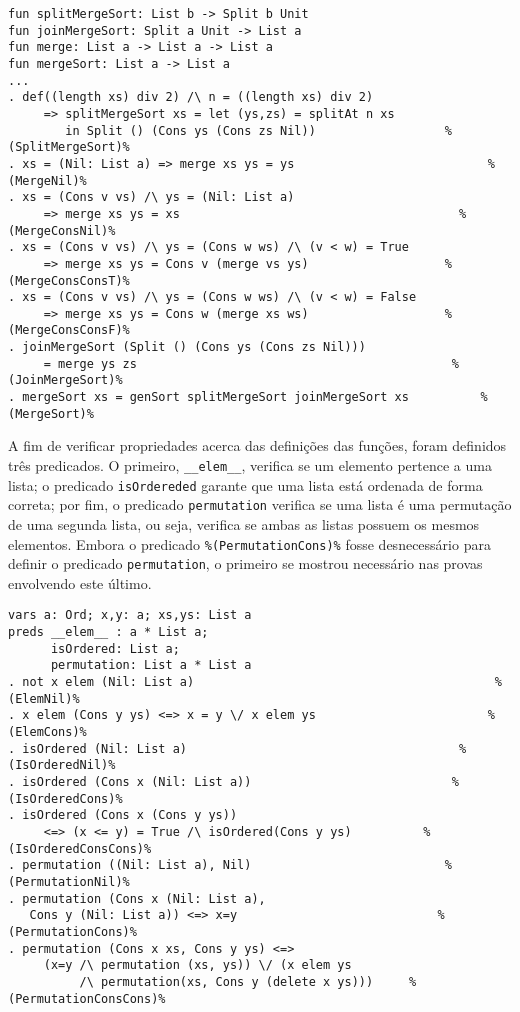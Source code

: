 \begin{Verbatim}
fun splitMergeSort: List b -> Split b Unit
fun joinMergeSort: Split a Unit -> List a
fun merge: List a -> List a -> List a
fun mergeSort: List a -> List a
...
. def((length xs) div 2) /\ n = ((length xs) div 2) 
     => splitMergeSort xs = let (ys,zs) = splitAt n xs
        in Split () (Cons ys (Cons zs Nil))                  %(SplitMergeSort)%
. xs = (Nil: List a) => merge xs ys = ys                           %(MergeNil)%
. xs = (Cons v vs) /\ ys = (Nil: List a) 
     => merge xs ys = xs                                       %(MergeConsNil)%
. xs = (Cons v vs) /\ ys = (Cons w ws) /\ (v < w) = True 
     => merge xs ys = Cons v (merge vs ys)                   %(MergeConsConsT)%
. xs = (Cons v vs) /\ ys = (Cons w ws) /\ (v < w) = False 
     => merge xs ys = Cons w (merge xs ws)                   %(MergeConsConsF)%
. joinMergeSort (Split () (Cons ys (Cons zs Nil))) 
     = merge ys zs                                            %(JoinMergeSort)%
. mergeSort xs = genSort splitMergeSort joinMergeSort xs          %(MergeSort)%
\end{Verbatim}

A fim de verificar propriedades acerca das definições das funções, foram definidos três predicados.
O primeiro, \Verb.__elem__., verifica se um elemento pertence a uma lista;
o predicado \Verb.isOrdereded. garante que uma lista está ordenada de forma correta;
por fim, o predicado \Verb.permutation. verifica se uma lista é uma permutação de uma segunda lista, ou seja, verifica se ambas as listas possuem os mesmos elementos.
Embora o predicado \Verb.%

\begin{Verbatim}
vars a: Ord; x,y: a; xs,ys: List a
preds __elem__ : a * List a;
      isOrdered: List a;
      permutation: List a * List a
. not x elem (Nil: List a)                                          %(ElemNil)%
. x elem (Cons y ys) <=> x = y \/ x elem ys                        %(ElemCons)%
. isOrdered (Nil: List a)                                      %(IsOrderedNil)%
. isOrdered (Cons x (Nil: List a))                            %(IsOrderedCons)%
. isOrdered (Cons x (Cons y ys))                    
     <=> (x <= y) = True /\ isOrdered(Cons y ys)          %(IsOrderedConsCons)%
. permutation ((Nil: List a), Nil)                           %(PermutationNil)%
. permutation (Cons x (Nil: List a),                
   Cons y (Nil: List a)) <=> x=y                            %(PermutationCons)%
. permutation (Cons x xs, Cons y ys) <=>            
     (x=y /\ permutation (xs, ys)) \/ (x elem ys    
          /\ permutation(xs, Cons y (delete x ys)))     %(PermutationConsCons)%
\end{Verbatim}

